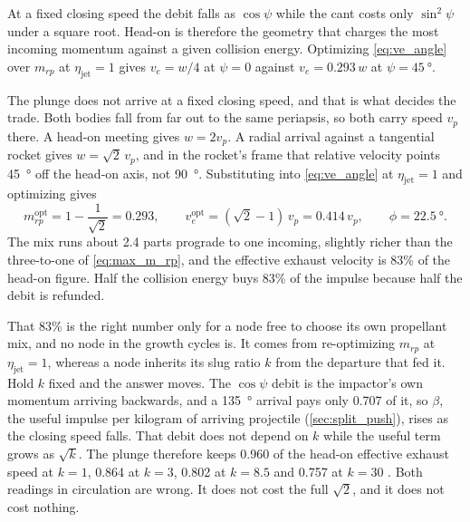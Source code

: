 \documentclass{article}
\begin{document}
At a fixed closing speed the debit falls as $\cos\psi$ while the cant costs only $\sin^2\psi$ under a square root. Head-on is therefore the geometry that charges the most incoming momentum against a given collision energy. Optimizing \autoref{eq:ve_angle} over $m_{rp}$ at $\eta_{\mathrm{jet}} = 1$ gives $v_e = w/4$ at $\psi = 0$ against $v_e = 0.293\,w$ at $\psi = \SI{45}{\degree}$.

The plunge does not arrive at a fixed closing speed, and that is what decides the trade. Both bodies fall from far out to the same periapsis, so both carry speed $v_p$ there. A head-on meeting gives $w = 2v_p$. A radial arrival against a tangential rocket gives $w = \sqrt{2}\,v_p$, and in the rocket's frame that relative velocity points \SI{45}{\degree} off the head-on axis, not \SI{90}{\degree}. Substituting into \autoref{eq:ve_angle} at $\eta_{\mathrm{jet}} = 1$ and optimizing gives
\begin{equation}
m_{rp}^{\mathrm{opt}} = 1 - \frac{1}{\sqrt{2}} = 0.293,
\qquad
v_e^{\mathrm{opt}} = (\sqrt{2}-1)\,v_p = 0.414\,v_p,
\qquad
\phi = \SI{22.5}{\degree}.
\label{eq:radial_optimum}
\end{equation}
The mix runs about 2.4 parts prograde to one incoming, slightly richer than the three-to-one of \autoref{eq:max_m_rp}, and the effective exhaust velocity is 83\% of the head-on figure. Half the collision energy buys 83\% of the impulse because half the debit is refunded.

That 83\% is the right number only for a node free to choose its own propellant mix, and no node in the growth cycles is. It comes from re-optimizing $m_{rp}$ at $\eta_{\mathrm{jet}} = 1$, whereas a node inherits its slug ratio $k$ from the departure that fed it. Hold $k$ fixed and the answer moves. The $\cos\psi$ debit is the impactor's own momentum arriving backwards, and a \SI{135}{\degree} arrival pays only \num{0.707} of it, so $\beta$, the useful impulse per kilogram of arriving projectile (\autoref{sec:split_push}), rises as the closing speed falls. That debit does not depend on $k$ while the useful term grows as $\sqrt{k}$. The plunge therefore keeps \num{0.960} of the head-on effective exhaust speed at $k = 1$, \num{0.864} at $k = 3$, \num{0.802} at $k = 8.5$ and \num{0.757} at $k = 30$ \cite{Katz_aim_is_all_you_need_2025}. Both readings in circulation are wrong. It does not cost the full $\sqrt{2}$, and it does not cost nothing.
\end{document}
